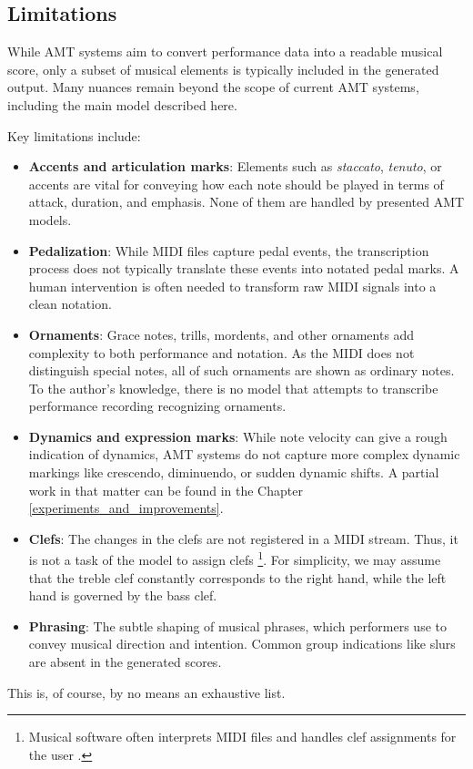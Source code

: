 \subsection{Limitations}

While AMT systems aim to convert performance data into a readable musical score, only a subset of musical elements is typically included in the generated output. Many nuances remain beyond the scope of current AMT systems, including the main model described here.

Key limitations include: \begin{itemize}
	\item {\bf Accents and articulation marks}: Elements such as \emph{staccato}, \emph{tenuto}, or accents are vital for conveying how each note should be played in terms of attack, duration, and emphasis. None of them are handled by presented AMT models.
	\item {\bf Pedalization}: While MIDI files capture pedal events, the transcription process does not typically translate these events into notated pedal marks. A human intervention is often needed to transform raw MIDI signals into a clean notation.
	\item {\bf Ornaments}: Grace notes, trills, mordents, and other ornaments add complexity to both performance and notation. As the MIDI does not distinguish special notes, all of such ornaments are shown as ordinary notes. To the author's knowledge, there is no model that attempts to transcribe performance recording recognizing ornaments.
	\item {\bf Dynamics and expression marks}: While note velocity can give a rough indication of dynamics, AMT systems do not capture more complex dynamic markings like crescendo, diminuendo, or sudden dynamic shifts. A partial work in that matter can be found in the Chapter \ref{experiments_and_improvements}.
	\item {\bf Clefs}: The changes in the clefs are not registered in a MIDI stream. Thus, it is not a task of the model to assign clefs \footnote{Musical software often interprets MIDI files and handles clef assignments for the user \missing.}. For simplicity, we may assume that the treble clef constantly corresponds to the right hand, while the left hand is governed by the bass clef.
	\item {\bf Phrasing}: The subtle shaping of musical phrases, which performers use to convey musical direction and intention. Common group indications like slurs are absent in the generated scores. \end{itemize}

This is, of course, by no means an exhaustive list.
